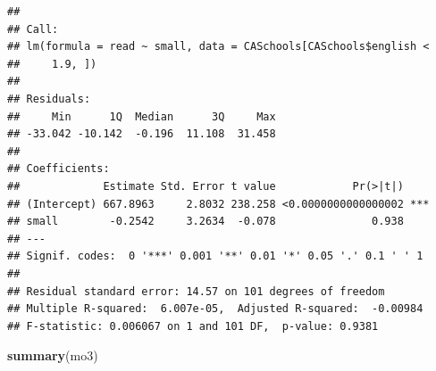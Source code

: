 \documentclass[
]{book}
\newenvironment{Shaded}{\begin{snugshade}}{\end{snugshade}}
\newcommand{\DataTypeTok}[1]{\textcolor[rgb]{0.13,0.29,0.53}{#1}}
\newcommand{\DecValTok}[1]{\textcolor[rgb]{0.00,0.00,0.81}{#1}}
\newcommand{\FloatTok}[1]{\textcolor[rgb]{0.00,0.00,0.81}{#1}}
\newcommand{\KeywordTok}[1]{\textcolor[rgb]{0.13,0.29,0.53}{\textbf{#1}}}
\newcommand{\NormalTok}[1]{#1}
\newcommand{\OperatorTok}[1]{\textcolor[rgb]{0.81,0.36,0.00}{\textbf{#1}}}
\newcommand{\StringTok}[1]{\textcolor[rgb]{0.31,0.60,0.02}{#1}}
\begin{document}
\begin{Shaded}
\end{Shaded}

\begin{verbatim}
## 
## Call:
## lm(formula = read ~ small, data = CASchools[CASchools$english < 
##     1.9, ])
## 
## Residuals:
##     Min      1Q  Median      3Q     Max 
## -33.042 -10.142  -0.196  11.108  31.458 
## 
## Coefficients:
##             Estimate Std. Error t value            Pr(>|t|)    
## (Intercept) 667.8963     2.8032 238.258 <0.0000000000000002 ***
## small        -0.2542     3.2634  -0.078               0.938    
## ---
## Signif. codes:  0 '***' 0.001 '**' 0.01 '*' 0.05 '.' 0.1 ' ' 1
## 
## Residual standard error: 14.57 on 101 degrees of freedom
## Multiple R-squared:  6.007e-05,  Adjusted R-squared:  -0.00984 
## F-statistic: 0.006067 on 1 and 101 DF,  p-value: 0.9381
\end{verbatim}

\begin{Shaded}
\begin{Highlighting}[]
\KeywordTok{summary}\NormalTok{(mo3)}
\end{Highlighting}
\end{Shaded}
\end{document}
